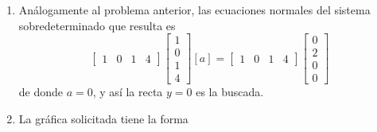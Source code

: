 \documentclass[11pt]{article}
\begin{document}
\begin{enumerate}
\begin{enumerate}
$$=
\begin{bmatrix} 0  		\\ 2 		\end{bmatrix}
$$
Cuya soluci\'on en el sentido de m\'inimos cuadrados es
$$
m=
\frac	{det\left(\begin{bmatrix} 0 & 2 	\\ 2 & 4 	\end{bmatrix}\right)}
		{det\left(\begin{bmatrix} 6 & 2 	\\ 2 & 4 	\end{bmatrix}\right)}=\frac{-1}{5}, 
        \quad 
n=
\frac	{det\left(\begin{bmatrix} 6 & 0 	\\ 2 & 2 	\end{bmatrix}\right)}
		{det\left(\begin{bmatrix} 6 & 2 	\\ 2 & 4 	\end{bmatrix}\right)}=\frac{3}{5}, 
        \quad  
$$
as\'i $r(x)=\frac{-1}{3}x+\frac{2}{3}$ es la recta buscada.  \fbox{5pt}
\item Análogamente al problema anterior, las ecuaciones normales del sistema sobredeterminado que resulta es
$$
\begin{bmatrix}
1 & 0 & 1 & 4
\end{bmatrix}
\begin{bmatrix}
1 \\ 0 \\ 1 \\ 4
\end{bmatrix}
[a]
=\begin{bmatrix}
1 & 0 & 1 & 4
\end{bmatrix}
\begin{bmatrix}
0 \\2 \\ 0 \\0 
\end{bmatrix}
$$
de donde
$a=0$, y as\'i la recta $y=0$ es la buscada. \fbox{5pt}
\item La gráfica solicitada tiene la forma
    \begin{center}
        \end{center}
\end{enumerate}

 \end{enumerate}
\end{document}
